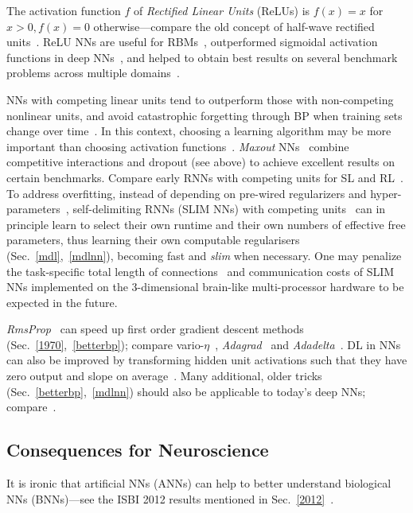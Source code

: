 \documentclass[letterpaper]{article}
\begin{document}
\begin{CJK*}{UTF8}{gbsn}
The activation function $f$ of {\em Rectified Linear Units} (ReLUs)  is
$f(x) =  x$ for $x > 0, f(x)=0$ otherwise---compare the old concept of half-wave rectified units~\citep{malik1990}.
ReLU NNs are useful for RBMs~\citep{Nair2010,Maas2013}, outperformed sigmoidal activation
functions in deep NNs~\citep{Glorot2011a}, and helped to obtain  best results on several benchmark 
problems across multiple domains~\citep[e.g.,][]{Krizhevsky:2012,Dahl2013}.



NNs with competing linear units tend to outperform those with non-competing nonlinear
units, and avoid catastrophic forgetting through BP 
when training sets change over time~\citep{srivastava2013compete}. In this context,
choosing a learning algorithm may be more important than choosing activation functions~\citep{Goodfellow2014}.
{\em Maxout} NNs~\citep{goodfellow2013maxout} combine
competitive interactions and 
dropout (see above) to achieve excellent results on certain
benchmarks.
Compare early RNNs with competing units for SL and RL~\citep{Schmidhuber:89cs}.
To address overfitting, instead of depending on  pre-wired regularizers and hyper-parameters~\citep{Hertz:91,bishop:2006},
self-delimiting RNNs (SLIM NNs) with competing units~\citep{Schmidhuber:12slimnn}
can in principle learn to select their own runtime and their own numbers of effective free parameters,
thus learning their own computable regularisers (Sec.~\ref{mdl},~\ref{mdlnn}), 
 becoming fast and  {\em slim} when necessary.
One may  penalize the task-specific  total length of connections~\citep[e.g.,][]{maass2002wire,Schmidhuber:12slimnn,Schmidhuber:13powerplay,clune2013modular} 
and communication costs of 
SLIM NNs implemented on the 3-dimensional brain-like multi-processor 
hardware to be expected in the future.


{\em RmsProp}~\citep{Tieleman2012,Schaul2012} can speed up first order gradient descent methods (Sec.~\ref{1970},~\ref{betterbp}); 
compare vario-$\eta$~\citep{DBLP:conf/nips/NeuneierZ96},
{\em Adagrad}~\citep{Duchi2011} and {\em Adadelta}~\citep{zeiler2012}.
DL in NNs can also be improved
by transforming hidden unit activations such that they have zero output and slope on average~\citep{raiko2012}.
Many additional, older tricks (Sec.~\ref{betterbp},~\ref{mdlnn}) should also be applicable to today's deep NNs;
compare~\citep{orr1998neural,tricksofthetrade:2012}.




\subsection{Consequences for Neuroscience}
\label{bnn}
It is ironic that artificial NNs (ANNs) can help to better understand biological NNs (BNNs)---see the ISBI 2012 results 
mentioned in Sec.~\ref{2012}~\citep{isbi12,ciresan2012nips}.


\end{CJK*}
\end{document}
